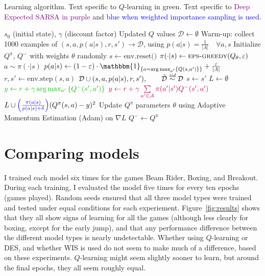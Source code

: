 \documentclass{article}
\begin{document}
\begin{algorithm}
    \caption{Learning algorithm. Text specific to \textcolor{dgreen}{\(Q\)-learning in green}. Text specific to \textcolor{purple}{Deep Expected SARSA in purple} and \textcolor{blue}{blue when weighted importance sampling is used}.}
    \begin{algorithmic}
        \Require $s_0$ (initial state), $\gamma$ (discount factor)
        \Ensure Updated $Q$ values
        \State \(\mathcal{D} \gets \emptyset\)
        \State Warm-up: collect 1000 examples of $(s, a, p(a|s), r, s') \rightarrow \mathcal{D}$, using $p(a|s) = \frac{1}{|A|} \quad \forall a, s$
        \State Initialize $Q^\pi$, $Q^-$ with weights \(\theta\) randomly
            \State $s \gets \text{env.reset()}$
                \State $\pi(\cdot | s) \gets \Call{eps-greedy}{Q_\theta, \eps}$
                \State $a \sim \pi(\cdot|s)$
                \State $p(a|s) \gets (1 - \eps) \cdot \mathbbm{1}_{\set{a = \arg\max_{a'}\set{Q(s,a')}}} + \frac{\eps}{|A|}$
                \State $r, s' \gets \text{env.step}(s, a)$
                \State $\mathcal{D} \cup (s, a, p(a|s), r, s'),\qquad \tilde{\mathcal{D}} \overset{\textit{iid}}{\sim}\mathcal{D}$
                \State $s \gets s'$
                \State $L \gets \emptyset$
                    \State $\textcolor{dgreen}{y \gets r + \gamma \arg\max_{a'}\set{Q^-(s',a')}}$
                    \State $\textcolor{purple}{y \gets r + \gamma \sum\limits_{a' \in \mathcal{A}} \pi(a' | s') Q^-(s', a')}$
                    \State $L \cup \textcolor{blue}{\left( \frac{\pi(a|s)}{p(a|s) + \delta} \right)} (Q^\pi(s, a) - y)^2$ %
                    \EndFor
                \State Update $Q^\pi$ parameters \(\theta\) using Adaptive Momentum Estimation (Adam) on \(\nabla L\)
                    \State $Q^- \gets Q^\pi$
                \EndIf
            \EndWhile
        \EndFor
    \end{algorithmic}
\end{algorithm}

\section{Comparing models}
I trained each model six times for the games Beam Rider, Boxing, and Breakout. During each training, I evaluated the model five times for every ten epochs (games played). Random seeds ensured that all three model types were trained and tested under equal conditions for each experiement. Figure~\ref{fig:results} shows that they all show signs of learning for all the games (although less clearly for boxing, except for the early jump), and that any performance difference between the different model types is nearly undetectable. Whether using \(Q\)-learning or DES, and whether WIS is used do not seem to make much of a difference, based on these experiments. \(Q\)-learning might seem slightly sooner to learn, but around the final epochs, they all seem roughly equal.
\end{document}
